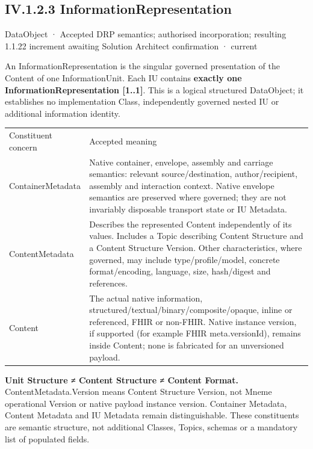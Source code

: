 \subsection*{IV.1.2.3 InformationRepresentation}
\label{navigation:IV.1.2.3}

\label{element:b9891b88150840ada3daefdec6f26c35}
{\small DataObject · Accepted DRP semantics; authorised incorporation; resulting 1.1.22 increment awaiting Solution Architect confirmation · current}\par

An InformationRepresentation is the singular governed presentation of the Content
of one InformationUnit. Each IU contains \textbf{exactly one InformationRepresentation
[1..1]}. This is a logical structured DataObject; it establishes no implementation
Class, independently governed nested IU or additional information identity.



\begin{longtable}{>{\raggedright\arraybackslash}p{}>{\raggedright\arraybackslash}p{}}
Constituent concern & Accepted meaning \\
ContainerMetadata & Native container, envelope, assembly and carriage semantics: relevant source/destination, author/recipient, assembly and interaction context. Native envelope semantics are preserved where governed; they are not invariably disposable transport state or IU Metadata. \\
ContentMetadata & Describes the represented Content independently of its values. Includes a Topic describing Content Structure and a Content Structure Version. Other characteristics, where governed, may include type/profile/model, concrete format/encoding, language, size, hash/digest and references. \\
Content & The actual native information, structured/textual/binary/composite/opaque, inline or referenced, FHIR or non-FHIR. Native instance version, if supported (for example FHIR meta.versionId), remains inside Content; none is fabricated for an unversioned payload. \\
\end{longtable}


\textbf{Unit Structure ≠ Content Structure ≠ Content Format.} ContentMetadata.Version
means Content Structure Version, not Mneme operational Version or native payload
instance version. Container Metadata, Content Metadata and IU Metadata remain
distinguishable. These constituents are semantic structure, not additional Classes,
Topics, schemas or a mandatory list of populated fields.




